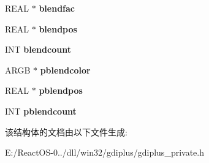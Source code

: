 \begin{DoxyCompactItemize}
R\+E\+AL $\ast$ {\bfseries blendfac}
\item 
\mbox{\label{struct_gp_line_gradient_a13db7c578d89d55806ded8f094ea9761}} 
R\+E\+AL $\ast$ {\bfseries blendpos}
\item 
\mbox{\label{struct_gp_line_gradient_afce2d98c619a86ce755daa2de3a81215}} 
I\+NT {\bfseries blendcount}
\item 
\mbox{\label{struct_gp_line_gradient_ad6dc0e5c8231c598725478aca543cabb}} 
A\+R\+GB $\ast$ {\bfseries pblendcolor}
\item 
\mbox{\label{struct_gp_line_gradient_a7c3963b87d9da799dd2f79eab54dc95c}} 
R\+E\+AL $\ast$ {\bfseries pblendpos}
\item 
\mbox{\label{struct_gp_line_gradient_a85363f166c2e7474a2b23ea2449afb62}} 
I\+NT {\bfseries pblendcount}
\end{DoxyCompactItemize}


该结构体的文档由以下文件生成\+:\begin{DoxyCompactItemize}
\item 
E\+:/\+React\+O\+S-\/0../dll/win32/gdiplus/gdiplus\+\_\+private.\+h\end{DoxyCompactItemize}
